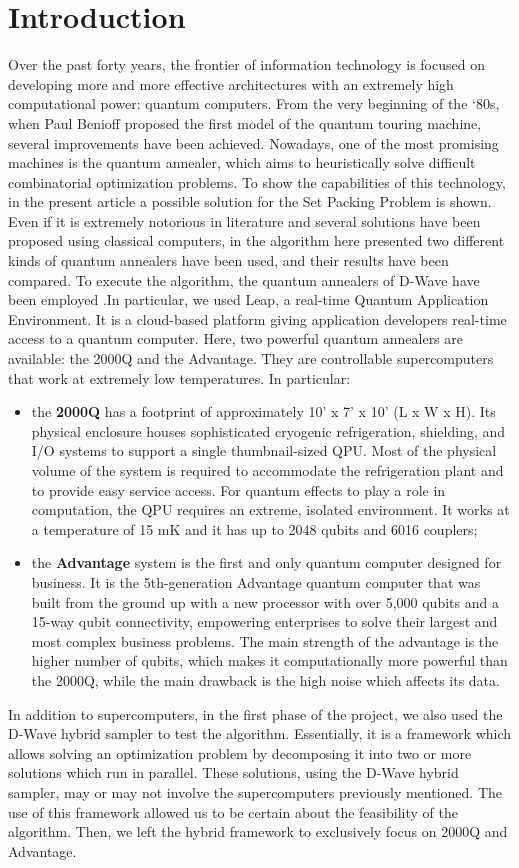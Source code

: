 \documentclass[oneside,a4paper]{article}
\begin{document}
\section{Introduction}
Over the past forty years, the frontier of information technology is focused on developing more and more effective architectures with an extremely high computational power: quantum computers. From the very beginning of the ‘80s, when Paul Benioff proposed the first model of the quantum touring machine, several improvements have been achieved. Nowadays, one of the most promising machines is the quantum annealer, which aims to heuristically solve difficult combinatorial optimization problems\cite{WebSite3}. To show the capabilities of this technology, in the present article a possible solution for the Set Packing Problem is shown. Even if it is extremely notorious in literature and several solutions have been proposed using classical computers, in the algorithm here presented two different kinds of quantum annealers have been used, and their results have been compared.
To execute the algorithm, the quantum annealers of D-Wave have been employed \cite{article1}.In particular, we used Leap, a real-time Quantum Application Environment. It is a cloud-based platform giving application developers real-time access to a quantum computer. Here, two powerful quantum annealers are available: the 2000Q and the Advantage. They are controllable supercomputers that work at extremely low temperatures. In particular: 
\begin{itemize}
    \item the \textbf{2000Q} has a footprint of approximately 10' x 7' x 10' (L x W x H). Its physical enclosure houses sophisticated cryogenic refrigeration, shielding, and I/O systems to support a single thumbnail-sized QPU.  Most of the physical volume of the system is required to accommodate the refrigeration plant and to provide easy service access.  For quantum effects to play a role in computation, the QPU requires an extreme, isolated environment. It works at a temperature of 15 mK and it has up to 2048 qubits and 6016 couplers;
    \item the \textbf{Advantage} system is the first and only quantum computer designed for business. It is the 5th-generation Advantage quantum computer that was built from the ground up with a new processor with over 5,000 qubits and a 15-way qubit connectivity, empowering enterprises to solve their largest and most complex business problems. The main strength of the advantage is the higher number of qubits, which makes it computationally more powerful than the 2000Q, while the main drawback is the high noise which affects its data.
\end{itemize}
In addition to supercomputers, in the first phase of the project, we also used the D-Wave hybrid sampler \cite{WebSite6} to test the algorithm. Essentially, it is a framework which allows solving an optimization problem by decomposing it into two or more solutions which run in parallel. These solutions, using the D-Wave hybrid sampler, may or may not involve the supercomputers previously mentioned. The use of this framework allowed us to be certain about the feasibility of the algorithm. Then, we left the hybrid framework to exclusively focus on 2000Q and Advantage.
\end{document}
